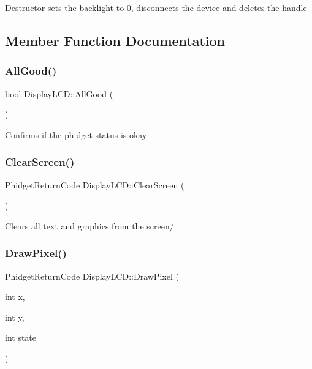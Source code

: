 Destructor sets the backlight to 0, disconnects the device and deletes the handle

\subsection{Member Function Documentation}
\mbox{\label{classDisplayLCD_ada423180074b506b76c1bce2ee0762bd}} 
\subsubsection{\texorpdfstring{All\+Good()}{AllGood()}}
{\footnotesize\ttfamily bool Display\+L\+C\+D\+::\+All\+Good (\begin{DoxyParamCaption}{ }\end{DoxyParamCaption})\hspace{0.3cm}{\ttfamily [inline]}}

Confirms if the phidget status is okay\mbox{\label{classDisplayLCD_ac3ea2662388a42733fbf525f3d933be7}} 
\subsubsection{\texorpdfstring{Clear\+Screen()}{ClearScreen()}}
{\footnotesize\ttfamily Phidget\+Return\+Code Display\+L\+C\+D\+::\+Clear\+Screen (\begin{DoxyParamCaption}{ }\end{DoxyParamCaption})\hspace{0.3cm}{\ttfamily [inline]}}

Clears all text and graphics from the screen/\mbox{\label{classDisplayLCD_aa3417ad0c5f9097ae5124ef15b35f793}} 
\subsubsection{\texorpdfstring{Draw\+Pixel()}{DrawPixel()}}
{\footnotesize\ttfamily Phidget\+Return\+Code Display\+L\+C\+D\+::\+Draw\+Pixel (\begin{DoxyParamCaption}\item[{int}]{x,  }\item[{int}]{y,  }\item[{int}]{state }\end{DoxyParamCaption})\hspace{0.3cm}{\ttfamily [inline]}}

